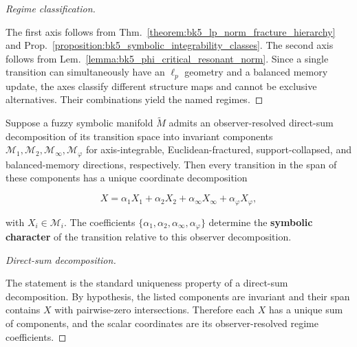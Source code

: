 \begin{proof}[Regime classification]
\label{proof:bk5_complete_symbolic_regime_classification}
\leavevmode

The first axis follows from Thm.~\ref{theorem:bk5_lp_norm_fracture_hierarchy}
and Prop.~\ref{proposition:bk5_symbolic_integrability_classes}.  The second
axis follows from Lem.~\ref{lemma:bk5_phi_critical_resonant_norm}.  Since a
single transition can simultaneously have an $\ell_p$ geometry and a balanced
memory update, the axes classify different structure maps and cannot be
exclusive alternatives.  Their combinations yield the named regimes.
\end{proof}

\begin{theorem}
\label{theorem:bk5_symbolic_manifold_spectral_decomposition}
Suppose a fuzzy symbolic manifold $\tilde{M}$ admits an observer-resolved
direct-sum decomposition of its transition space into invariant components
$\mathcal{M}_1,\mathcal{M}_2,\mathcal{M}_\infty,\mathcal{M}_{\varphi}$ for
axis-integrable, Euclidean-fractured, support-collapsed, and balanced-memory
directions, respectively.  Then every transition in the span of these components
has a unique coordinate decomposition

\[
X=\alpha_1 X_1+\alpha_2 X_2+\alpha_\infty X_\infty+\alpha_\varphi X_\varphi,
\]

with $X_i\in\mathcal{M}_i$.  The coefficients
$\{\alpha_1,\alpha_2,\alpha_\infty,\alpha_\varphi\}$ determine the
\textbf{symbolic character} of the transition relative to this observer
decomposition.
\end{theorem}

\begin{proof}[Direct-sum decomposition]
\label{proof:bk5_symbolic_manifold_spectral_decomposition}
\leavevmode

The statement is the standard uniqueness property of a direct-sum
decomposition.  By hypothesis, the listed components are invariant and their
span contains $X$ with pairwise-zero intersections.  Therefore each $X$ has a
unique sum of components, and the scalar coordinates are its observer-resolved
regime coefficients.
\end{proof}

